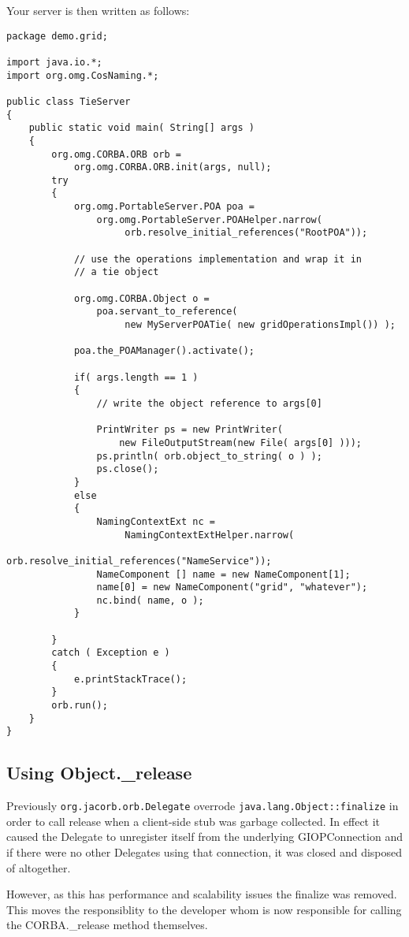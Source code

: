 Your server is then written as follows:

\begin{verbatim}
package demo.grid;

import java.io.*;
import org.omg.CosNaming.*;

public class TieServer
{
    public static void main( String[] args )
    {
        org.omg.CORBA.ORB orb =
            org.omg.CORBA.ORB.init(args, null);
        try
        {
            org.omg.PortableServer.POA poa =
                org.omg.PortableServer.POAHelper.narrow(
                     orb.resolve_initial_references("RootPOA"));

            // use the operations implementation and wrap it in
            // a tie object

            org.omg.CORBA.Object o =
                poa.servant_to_reference(
                     new MyServerPOATie( new gridOperationsImpl()) );

            poa.the_POAManager().activate();

            if( args.length == 1 )
            {
                // write the object reference to args[0]

                PrintWriter ps = new PrintWriter(
                    new FileOutputStream(new File( args[0] )));
                ps.println( orb.object_to_string( o ) );
                ps.close();
            }
            else
            {
                NamingContextExt nc =
                     NamingContextExtHelper.narrow(
                        orb.resolve_initial_references("NameService"));
                NameComponent [] name = new NameComponent[1];
                name[0] = new NameComponent("grid", "whatever");
                nc.bind( name, o );
            }

        }
        catch ( Exception e )
        {
            e.printStackTrace();
        }
        orb.run();
    }
}
\end{verbatim}

\subsection{Using Object.\_release}

Previously {\tt org.jacorb.orb.Delegate} overrode
{\tt java.lang.Object::finalize} in order to call release when a client-side
stub was garbage collected. In effect it caused the Delegate to unregister
 itself from the underlying GIOPConnection and if there were no other
Delegates using that connection, it was closed and disposed of altogether.

However, as this has performance and scalability issues the finalize was
removed. This moves the responsiblity to the developer whom is now responsible
for calling the CORBA.\_release method themselves.

